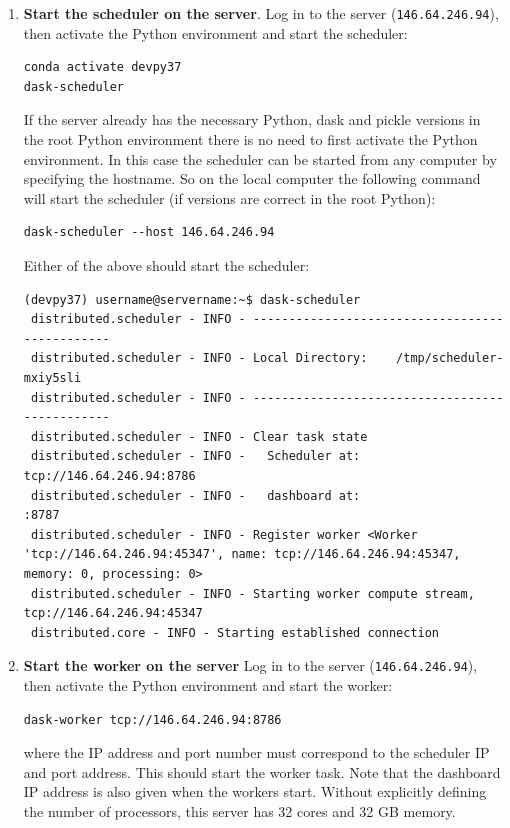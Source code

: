 \begin{enumerate}
\item \textbf{Start the scheduler on the server}. Log in to the server (\lstinline{146.64.246.94}), then activate the Python environment and start the scheduler:

\begin{lstlisting}
conda activate devpy37
dask-scheduler
\end{lstlisting}

If the server already has the necessary Python, dask and pickle versions in the root Python environment there is no need to first activate the Python environment.  In this case the scheduler can be started from any computer by specifying the hostname. So on the local computer the following command will start the scheduler (if versions are correct in the root Python):

\begin{lstlisting}
dask-scheduler --host 146.64.246.94
\end{lstlisting}

Either of the above should start the scheduler:
\begin{lstlisting}[style=tinysize]
(devpy37) username@servername:~$ dask-scheduler
 distributed.scheduler - INFO - -----------------------------------------------
 distributed.scheduler - INFO - Local Directory:    /tmp/scheduler-mxiy5sli
 distributed.scheduler - INFO - -----------------------------------------------
 distributed.scheduler - INFO - Clear task state
 distributed.scheduler - INFO -   Scheduler at:  tcp://146.64.246.94:8786
 distributed.scheduler - INFO -   dashboard at:                     :8787
 distributed.scheduler - INFO - Register worker <Worker 'tcp://146.64.246.94:45347', name: tcp://146.64.246.94:45347, memory: 0, processing: 0>
 distributed.scheduler - INFO - Starting worker compute stream, tcp://146.64.246.94:45347
 distributed.core - INFO - Starting established connection
\end{lstlisting}

\item \textbf{Start the worker on the server}  Log in to the server (\lstinline{146.64.246.94}), then activate the Python environment and start the worker:        

\begin{lstlisting}
dask-worker tcp://146.64.246.94:8786
\end{lstlisting}

where the IP address and port number must correspond to the scheduler IP and port address. This should start the worker task. Note that the dashboard IP address is also given when the workers start. Without explicitly defining the number of processors, this server has 32 cores and 32 GB memory.    


\end{enumerate}
